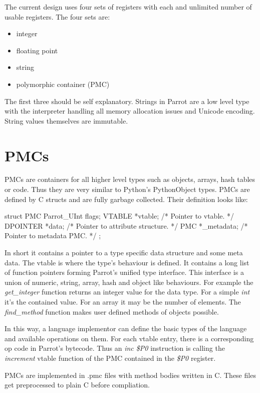 \documentclass[bachelor,english]{hgbthesis}
\begin{document}
The current design uses four sets of registers with each and unlimited number of usable registers. The four sets are:
%
\begin{itemize}
\item integer
\item floating point
\item string
\item polymorphic container (PMC)
\end{itemize}

The first three should be self explanatory. Strings in Parrot are a low level type with the interpreter handling all memory allocation issues and Unicode encoding. String values themselves are immutable.

\section{PMCs}

PMCs are containers for all higher level types such as objects, arrays, hash tables or code. Thus they are very similar to Python's PythonObject types. PMCs are defined by C structs and are fully garbage collected. Their definition looks like:
\begin{CCode}
struct PMC {
    Parrot_UInt    flags;
    VTABLE         *vtable;             /* Pointer to vtable. */
    DPOINTER       *data;               /* Pointer to attribute structure. */
    PMC            *_metadata;          /* Pointer to metadata PMC. */
};
\end{CCode}
In short it contains a pointer to a type specific data structure and some meta data. The vtable is where the type's behaviour is defined. It contains a long list of function pointers forming Parrot's unified type interface. This interface is a union of numeric, string, array, hash and object like behaviours. For example the  \textit{get\_integer} function returns an integer value for the data type. For a simple \textit{int} it's the contained value. For an array it may be the number of elements. The \textit{find\_method} function makes user defined methods of objects possible.

In this way, a language implementor can define the basic types of the language and available operations on them. For each vtable entry, there is a corresponding op code in Parrot's bytecode. Thus an \textit{inc \$P0} instruction is calling the \textit{increment} vtable function of the PMC contained in the \textit{\$P0} register.

PMCs are implemented in .pmc files with method bodies written in C. These files get preprocessed to plain C before compliation.
\end{document}
